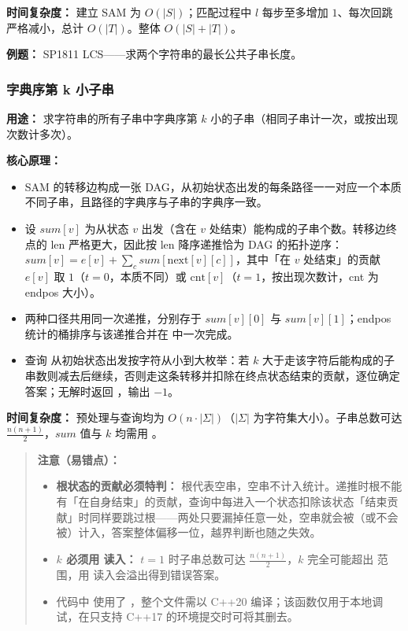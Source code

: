 \textbf{时间复杂度：} 建立 SAM 为 $O(|S|)$；匹配过程中 $l$ 每步至多增加 $1$、每次回跳严格减小，总计 $O(|T|)$。整体 $O(|S| + |T|)$。

\textbf{例题：} SP1811 LCS——求两个字符串的最长公共子串长度。



\subsubsection{字典序第 k 小子串}

\textbf{用途：} 求字符串的所有子串中字典序第 $k$ 小的子串（相同子串计一次，或按出现次数计多次）。

\textbf{核心原理：}
\begin{itemize}
  \item SAM 的转移边构成一张 DAG，从初始状态出发的每条路径一一对应一个本质不同子串，且路径的字典序与子串的字典序一致。
  \item 设 $sum[v]$ 为从状态 $v$ 出发（含在 $v$ 处结束）能构成的子串个数。转移边终点的 len 严格更大，因此按 len 降序递推恰为 DAG 的拓扑逆序：$sum[v] = e[v] + \sum_{c} sum[\text{next}[v][c]]$，其中「在 $v$ 处结束」的贡献 $e[v]$ 取 $1$（$t=0$，本质不同）或 $\text{cnt}[v]$（$t=1$，按出现次数计，cnt 为 endpos 大小）。
  \item 两种口径共用同一次递推，分别存于 $sum[v][0]$ 与 $sum[v][1]$；endpos 统计的桶排序与该递推合并在  中一次完成。
  \item 查询  从初始状态出发按字符从小到大枚举：若 $k$ 大于走该字符后能构成的子串数则减去后继续，否则走这条转移并扣除在终点状态结束的贡献，逐位确定答案；无解时返回 ，输出 $-1$。
\end{itemize}

\textbf{时间复杂度：} 预处理与查询均为 $O(n \cdot |\Sigma|)$（$|\Sigma|$ 为字符集大小）。子串总数可达 $\frac{n(n+1)}{2}$，$sum$ 值与 $k$ 均需用 。

\begin{quote}
\textbf{注意（易错点）：}
\begin{itemize}
  \item \textbf{根状态的贡献必须特判：} 根代表空串，空串不计入统计。递推时根不能有「在自身结束」的贡献，查询中每进入一个状态扣除该状态「结束贡献」时同样要跳过根——两处只要漏掉任意一处，空串就会被（或不会被）计入，答案整体偏移一位，越界判断也随之失效。
  \item \textbf{$k$ 必须用  读入：} $t=1$ 时子串总数可达 $\frac{n(n+1)}{2}$，$k$ 完全可能超出  范围，用  读入会溢出得到错误答案。
  \item 代码中  使用了 ，整个文件需以 C++20 编译；该函数仅用于本地调试，在只支持 C++17 的环境提交时可将其删去。
\end{itemize}
\end{quote}

